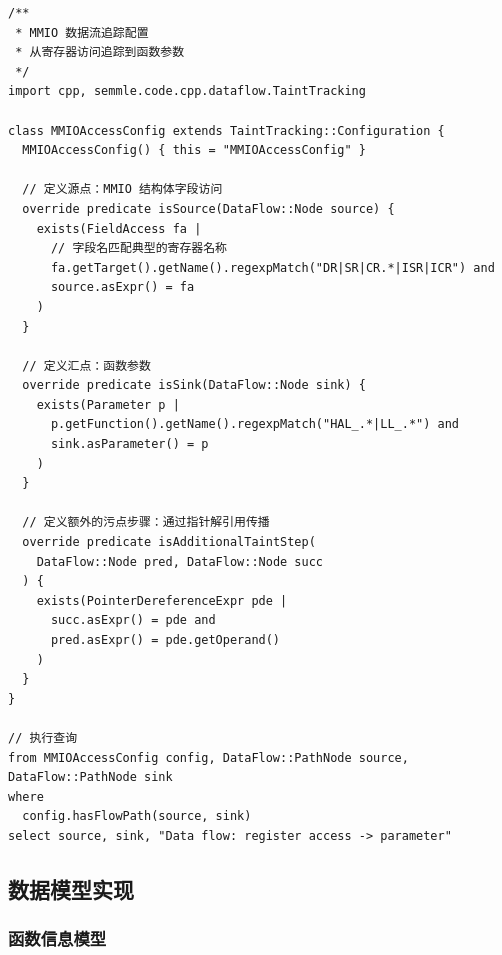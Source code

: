 \begin{lstlisting}[style=CStyle,abovecaptionskip=0pt,belowcaptionskip=0pt]
/**
 * MMIO 数据流追踪配置
 * 从寄存器访问追踪到函数参数
 */
import cpp, semmle.code.cpp.dataflow.TaintTracking

class MMIOAccessConfig extends TaintTracking::Configuration {
  MMIOAccessConfig() { this = "MMIOAccessConfig" }

  // 定义源点：MMIO 结构体字段访问
  override predicate isSource(DataFlow::Node source) {
    exists(FieldAccess fa |
      // 字段名匹配典型的寄存器名称
      fa.getTarget().getName().regexpMatch("DR|SR|CR.*|ISR|ICR") and
      source.asExpr() = fa
    )
  }

  // 定义汇点：函数参数
  override predicate isSink(DataFlow::Node sink) {
    exists(Parameter p |
      p.getFunction().getName().regexpMatch("HAL_.*|LL_.*") and
      sink.asParameter() = p
    )
  }

  // 定义额外的污点步骤：通过指针解引用传播
  override predicate isAdditionalTaintStep(
    DataFlow::Node pred, DataFlow::Node succ
  ) {
    exists(PointerDereferenceExpr pde |
      succ.asExpr() = pde and
      pred.asExpr() = pde.getOperand()
    )
  }
}

// 执行查询
from MMIOAccessConfig config, DataFlow::PathNode source, DataFlow::PathNode sink
where
  config.hasFlowPath(source, sink)
select source, sink, "Data flow: register access -> parameter"
\end{lstlisting}

\subsection{数据模型实现}

\subsubsection{函数信息模型}

